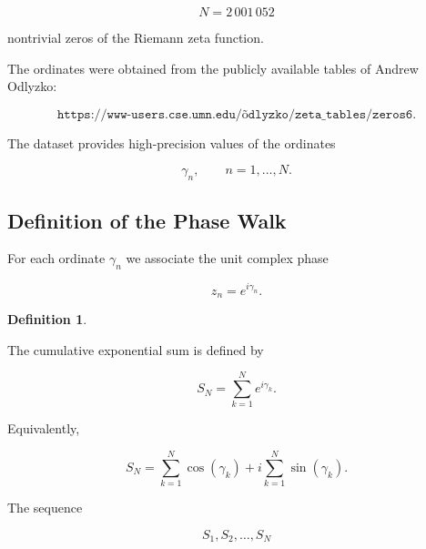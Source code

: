 \documentclass[11pt]{amsart}
\numberwithin{equation}{section}
\theoremstyle{plain}
\theoremstyle{definition}
\newtheorem{definition}[theorem]{Definition}
\theoremstyle{remark}
\begin{document}
\begin{equation}
N
=
2\,001\,052
\label{eq:number_of_zeros}
\end{equation}

nontrivial zeros of the Riemann zeta function.

The ordinates were obtained from the publicly available tables of
Andrew Odlyzko:

\begin{equation}
\texttt{https://www-users.cse.umn.edu/\~{}odlyzko/zeta\_tables/zeros6}.
\label{eq:odlyzko_source}
\end{equation}

The dataset provides high-precision values of the ordinates

\begin{equation}
\gamma_n,
\qquad
n=1,\ldots,N.
\label{eq:gamma_dataset}
\end{equation}

\subsection{Definition of the Phase Walk}
\label{subsec:phase_walk}

For each ordinate
\(\gamma_n\)
we associate the unit complex phase

\begin{equation}
z_n
=
e^{i\gamma_n}.
\label{eq:phase_definition}
\end{equation}

\begin{definition}
\label{def:SN}

The cumulative exponential sum is defined by

\begin{equation}
S_N
=
\sum_{k=1}^{N}
e^{i\gamma_k}.
\label{eq:SN_definition}
\end{equation}

\end{definition}

Equivalently,

\begin{equation}
S_N
=
\sum_{k=1}^{N}
\cos(\gamma_k)
+
i
\sum_{k=1}^{N}
\sin(\gamma_k).
\label{eq:SN_real_imag}
\end{equation}

The sequence

\begin{equation}
S_1,S_2,\ldots,S_N
\label{eq:SN_trajectory}
\end{equation}
\end{document}
